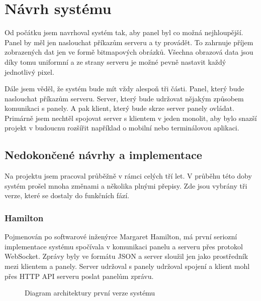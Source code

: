 \chapter{Návrh systému}

Od počátku jsem navrhoval systém tak, aby panel byl co možná nejhloupější. Panel by měl jen naslouchat příkazům serveru a ty provádět. To zahrnuje příjem zobrazených dat jen ve formě bitmapových obrázků. Všechna obrazová data jsou díky tomu uniformní a ze strany serveru je možné pevně nastavit každý jednotlivý pixel.

Dále jsem věděl, že systém bude mít vždy alespoň tři části. Panel, který bude naslouchat příkazům serveru. Server, který bude udržovat nějakým způsobem komunikaci s panely. A pak klient, který bude skrze server panely ovládat. Primárně jsem nechtěl spojovat server s klientem v jeden monolit, aby bylo snazší projekt v budoucnu rozšířit například o mobilní nebo terminálovou aplikaci.

\section{Nedokončené návrhy a implementace}
Na projektu jsem pracoval průběžně v rámci celých tří let. V průběhu této doby systém prošel mnoha změnami a několika plnými přepisy. Zde jsou vybrány tři verze, které se dostaly do funkčních fází.

\subsection{Hamilton}
Pojmenován po softwarové inženýrce Margaret Hamilton, má první seriozní implementace systému spočívala v komunikaci panelu a serveru přes protokol WebSocket. Zprávy byly ve formátu JSON a server sloužil jen jako prostředník mezi klientem a panely. Server udržoval s panely udržoval spojení a klient mohl přes HTTP API serveru poslat panelům zprávu.

\begin{figure}[h]
    \centering
    \caption{Diagram architektury první verze systému}
    \label{fig:first-system-architecture}
\end{figure}

